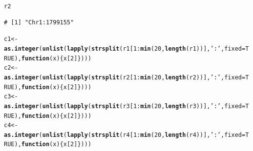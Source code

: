 \documentclass{article}\usepackage[]{graphicx}\usepackage[]{color}
\makeatletter
\newcommand{\hlnum}[1]{\textcolor[rgb]{0.686,0.059,0.569}{#1}}%
\newcommand{\hlstr}[1]{\textcolor[rgb]{0.192,0.494,0.8}{#1}}%
\newcommand{\hlopt}[1]{\textcolor[rgb]{0,0,0}{#1}}%
\newcommand{\hlstd}[1]{\textcolor[rgb]{0.345,0.345,0.345}{#1}}%
\newcommand{\hlkwa}[1]{\textcolor[rgb]{0.161,0.373,0.58}{\textbf{#1}}}%
\newcommand{\hlkwb}[1]{\textcolor[rgb]{0.69,0.353,0.396}{#1}}%
\newcommand{\hlkwc}[1]{\textcolor[rgb]{0.333,0.667,0.333}{#1}}%
\newcommand{\hlkwd}[1]{\textcolor[rgb]{0.737,0.353,0.396}{\textbf{#1}}}%
\newenvironment{kframe}{%
 \def\at@end@of@kframe{}%
 \ifinner\ifhmode%
  \def\at@end@of@kframe{\end{minipage}}%
  \begin{minipage}{\columnwidth}%
 \fi\fi%
 \def\FrameCommand##1{\hskip\@totalleftmargin \hskip-\fboxsep
 \colorbox{shadecolor}{##1}\hskip-\fboxsep
     \hskip-\linewidth \hskip-\@totalleftmargin \hskip\columnwidth}%
 \MakeFramed {\advance\hsize-\width
   \@totalleftmargin\z@ \linewidth\hsize
   \@setminipage}}%
 {\par\unskip\endMakeFramed%
 \at@end@of@kframe}
\newenvironment{knitrout}{}{} %
\makeatother
\begin{document}
\begin{knitrout}
\begin{kframe}
\begin{alltt}
\hlstd{r2}
\end{alltt}
\begin{verbatim}
# [1] "Chr1:1799155"
\end{verbatim}
\begin{alltt}
\hlstd{c1} \hlkwb{<-} \hlkwd{as.integer}\hlstd{(}\hlkwd{unlist}\hlstd{(}\hlkwd{lapply}\hlstd{(}\hlkwd{strsplit}\hlstd{(r1[}\hlnum{1}\hlopt{:}\hlkwd{min}\hlstd{(}\hlnum{20}\hlstd{,}\hlkwd{length}\hlstd{(r1))],}\hlstr{':'}\hlstd{,}\hlkwc{fixed}\hlstd{=}\hlnum{TRUE}\hlstd{),}\hlkwa{function}\hlstd{(}\hlkwc{x}\hlstd{)\{x[}\hlnum{2}\hlstd{]\})))}
\hlstd{c2} \hlkwb{<-} \hlkwd{as.integer}\hlstd{(}\hlkwd{unlist}\hlstd{(}\hlkwd{lapply}\hlstd{(}\hlkwd{strsplit}\hlstd{(r2[}\hlnum{1}\hlopt{:}\hlkwd{min}\hlstd{(}\hlnum{20}\hlstd{,}\hlkwd{length}\hlstd{(r2))],}\hlstr{':'}\hlstd{,}\hlkwc{fixed}\hlstd{=}\hlnum{TRUE}\hlstd{),}\hlkwa{function}\hlstd{(}\hlkwc{x}\hlstd{)\{x[}\hlnum{2}\hlstd{]\})))}
\hlstd{c3} \hlkwb{<-} \hlkwd{as.integer}\hlstd{(}\hlkwd{unlist}\hlstd{(}\hlkwd{lapply}\hlstd{(}\hlkwd{strsplit}\hlstd{(r3[}\hlnum{1}\hlopt{:}\hlkwd{min}\hlstd{(}\hlnum{20}\hlstd{,}\hlkwd{length}\hlstd{(r3))],}\hlstr{':'}\hlstd{,}\hlkwc{fixed}\hlstd{=}\hlnum{TRUE}\hlstd{),}\hlkwa{function}\hlstd{(}\hlkwc{x}\hlstd{)\{x[}\hlnum{2}\hlstd{]\})))}
\hlstd{c4} \hlkwb{<-} \hlkwd{as.integer}\hlstd{(}\hlkwd{unlist}\hlstd{(}\hlkwd{lapply}\hlstd{(}\hlkwd{strsplit}\hlstd{(r4[}\hlnum{1}\hlopt{:}\hlkwd{min}\hlstd{(}\hlnum{20}\hlstd{,}\hlkwd{length}\hlstd{(r4))],}\hlstr{':'}\hlstd{,}\hlkwc{fixed}\hlstd{=}\hlnum{TRUE}\hlstd{),}\hlkwa{function}\hlstd{(}\hlkwc{x}\hlstd{)\{x[}\hlnum{2}\hlstd{]\})))}


\end{alltt}
\end{kframe}
\end{knitrout}
\end{document}
